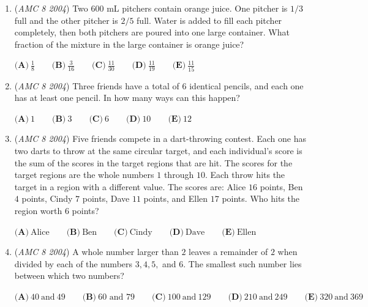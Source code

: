 \begin{enumerate}
 
<a href="/wiki/index.php?title=File:AMC8200415.gif" title="File:AMC8200415.gif">Error creating thumbnail: Unable to save thumbnail to destination</a>
$\textbf{(A)}\ 5\qquad \textbf{(B)}\ 7\qquad \textbf{(C)}\ 11\qquad \textbf{(D)}\ 12 \qquad \textbf{(E)}\ 18$


	\item (\textit{AMC 8 2004}) Two $600$ mL pitchers contain orange juice. One pitcher is $1/3$ full and the other pitcher is $2/5$ full. Water is added to fill each pitcher completely, then both pitchers are poured into one large container. What fraction of the mixture in the large container is orange juice?


 $\textbf{(A)}\ \frac18 \qquad \textbf{(B)}\ \frac{3}{16} \qquad \textbf{(C)}\ \frac{11}{30} \qquad \textbf{(D)}\ \frac{11}{19}\qquad \textbf{(E)}\ \frac{11}{15}$


	\item (\textit{AMC 8 2004}) Three friends have a total of $6$ identical pencils, and each one has at least one pencil. In how many ways can this happen?


 $\textbf{(A)}\ 1\qquad \textbf{(B)}\ 3\qquad \textbf{(C)}\ 6\qquad \textbf{(D)}\ 10 \qquad \textbf{(E)}\ 12$


	\item (\textit{AMC 8 2004}) Five friends compete in a dart-throwing contest. Each one has two darts to throw at the same circular target, and each individual's score is the sum of the scores in the target regions that are hit. The scores for the target regions are the whole numbers $1$ through $10$. Each throw hits the target in a region with a different value. The scores are: Alice $16$ points, Ben $4$ points, Cindy $7$ points, Dave $11$ points, and Ellen $17$ points. Who hits the region worth $6$ points?


 $\textbf{(A)}\ \text{Alice}\qquad \textbf{(B)}\ \text{Ben}\qquad \textbf{(C)}\ \text{Cindy}\qquad \textbf{(D)}\ \text{Dave} \qquad \textbf{(E)}\ \text{Ellen}$


	\item (\textit{AMC 8 2004}) A whole number larger than $2$ leaves a remainder of $2$ when divided by each of the numbers $3, 4, 5,$ and $6$. The smallest such number lies between which two numbers?


 $\textbf{(A)}\ 40\ \text{and}\ 49 \qquad \textbf{(B)}\ 60 \text{ and } 79 \qquad \textbf{(C)}\ 100\ \text{and}\ 129 \qquad \textbf{(D)}\ 210\ \text{and}\ 249\qquad \textbf{(E)}\ 320\ \text{and}\ 369$



\end{enumerate}
